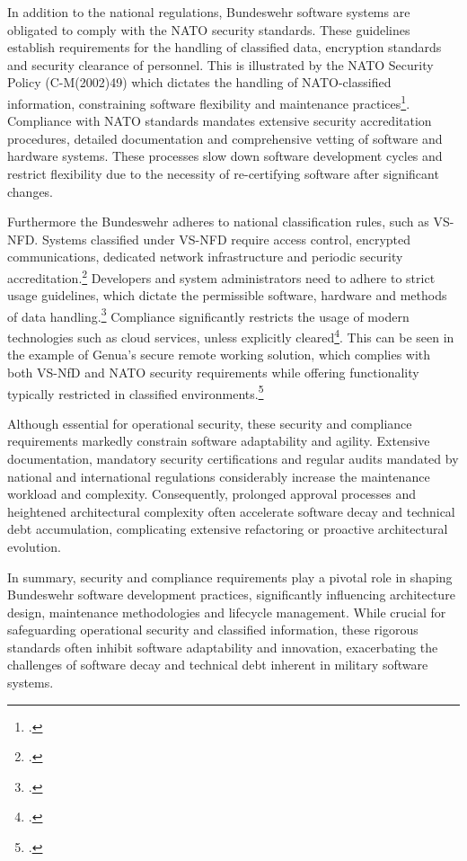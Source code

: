 In addition to the national regulations, Bundeswehr software systems are obligated to comply with the NATO security standards. These guidelines establish requirements for the handling of classified data, encryption standards and security clearance of personnel.
This is illustrated by the NATO Security Policy (C-M(2002)49) which dictates the handling of NATO-classified information, constraining software flexibility and maintenance practices\footcite[Enclosure B, pp. 1–3; Enclosure F, pp. 1–2]{NATO2002SecurityPolicy}. 
Compliance with NATO standards mandates extensive security accreditation procedures, detailed documentation and comprehensive vetting of software and hardware systems.
These processes slow down software development cycles and restrict flexibility due to the necessity of re-certifying software after significant changes.

Furthermore the Bundeswehr adheres to national classification rules, such as \ac{VS-NFD}. Systems classified under \ac{VS-NFD} require access control, encrypted communications, dedicated network infrastructure and periodic security accreditation.\footcite[see Part 2, pp. 1–3; Part 3, pp. 1–6]{BMI2010VSNFD}
Developers and system administrators need to adhere to strict usage guidelines, which dictate the permissible software, hardware and methods of data handling.\footcite[Part 3, No. 3.1–3.7, pp. 1–5]{BMI2010VSNFD} Compliance significantly restricts the usage of modern technologies such as cloud services, unless explicitly cleared\footcite[Part 3, No. 3.4.1–3.4.5, pp. 4–5]{BMI2010VSNFD}. 
This can be seen in the example of Genua’s secure remote working solution, which complies with both VS-NfD and NATO security requirements while offering functionality typically restricted in classified environments.\footcite{Genua2023VSNFD}

Although essential for operational security, these security and compliance requirements markedly constrain software adaptability and agility. 
Extensive documentation, mandatory security certifications and regular audits mandated by national and international regulations considerably increase the maintenance workload and complexity. 
Consequently, prolonged approval processes and heightened architectural complexity often accelerate software decay and technical debt accumulation, complicating extensive refactoring or proactive architectural evolution.

In summary, security and compliance requirements play a pivotal role in shaping Bundeswehr software development practices, significantly influencing architecture design, 
maintenance methodologies and lifecycle management. While crucial for safeguarding operational security and classified information, these rigorous standards often inhibit software adaptability and innovation, exacerbating the challenges of software decay and technical debt inherent in military software systems.

